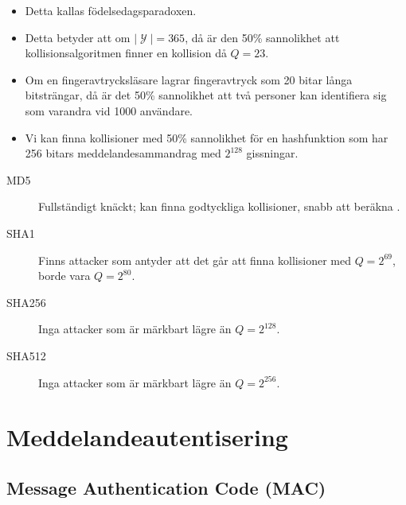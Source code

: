 \documentclass{beamer}
\theoremstyle{definition}
\DeclareMathOperator{\Y}{\mathcal{Y}}
\begin{document}
\begin{frame}{\insertsubsectionhead}
  \begin{itemize}
    \item Detta kallas födelsedagsparadoxen.

    \item Detta betyder att om \(|\Y| = 365\), då är den \unit{50}{\%} 
      sannolikhet att kollisionsalgoritmen finner en kollision då \(Q = 23\).

    \item Om en fingeravtrycksläsare lagrar fingeravtryck som 20 bitar långa 
      bitsträngar, då är det \unit{50}{\%} sannolikhet att två personer kan 
      identifiera sig som varandra vid 1000 användare.

    \item Vi kan finna kollisioner med \unit{50}{\%} sannolikhet för en 
      hashfunktion som har 256 bitars meddelandesammandrag med \(2^{128}\) 
      gissningar.

  \end{itemize}
\end{frame}

\begin{frame}{\insertsubsectionhead}
  \begin{description}
    \item[MD5] Fullständigt knäckt; kan finna godtyckliga kollisioner, snabb 
      att beräkna \citep[se][]{Lucks2005hc}.

    \item[SHA1] Finns attacker som antyder att det går att finna kollisioner 
      med \(Q = 2^{69}\), borde vara \(Q = 2^{80}\).

    \item[SHA256] Inga attacker som är märkbart lägre än \(Q = 2^{128}\).

    \item[SHA512] Inga attacker som är märkbart lägre än \(Q = 2^{256}\).

  \end{description}
\end{frame}


\section{Meddelandeautentisering}

\subsection{Message Authentication Code (MAC)}
\end{document}
